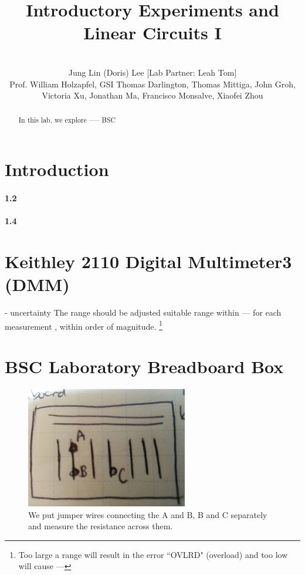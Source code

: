 \documentclass[10pt,letterpaper,oneside] {article}
\begin{document}
\title{Introductory Experiments and Linear Circuits I}
\author{\quad \\Jung Lin (Doris) Lee [Lab Partner: Leah Tom]\\Prof. William Holzapfel, GSI Thomas Darlington, Thomas Mittiga, John Groh,  \\Victoria Xu, Jonathan Ma, Francisco Monsalve, Xiaofei Zhou}
\maketitle
	\begin{abstract}
	In this lab, we explore ----- BSC 
	\end{abstract}


\section{Introduction}
 
\paragraph{\textbf{1.2}} 

\paragraph{\textbf{1.4}} 
   
 \section{Keithley 2110 Digital Multimeter3 (DMM)}
- uncertainty
The range should be adjusted  suitable range within --- for each measurement , within order of magnitude. \footnote{Too large a range will result in the error ``OVLRD" (overload) and too low will cause ---}
\section{BSC Laboratory Breadboard Box}
\begin{figure}[h!]
\includegraphics[width=200pt]{figure/d_breadboard}
\caption{We put jumper wires connecting the A and B, B and C separately and measure the resistance across them.}
\label{breadboard}
\end{figure}
\end{document}

